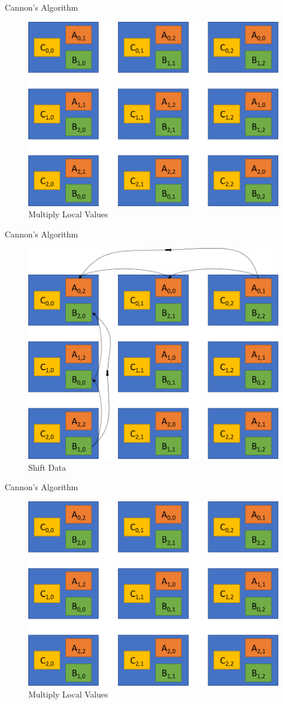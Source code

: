\documentclass[10pt]{beamer}
\begin{document}
\begin{frame}{Cannon's Algorithm}
\begin{figure}	
\centering
\includegraphics[width=0.72\linewidth]{figures/step_2_cannon_2.png}
\caption{Multiply Local Values}
\end{figure}
\end{frame}

\begin{frame}{Cannon's Algorithm}
\begin{figure}	
	\centering
	\includegraphics[width=0.72\linewidth]{figures/step_3_cannon_2.png}
	\caption{Shift Data}
\end{figure}
\end{frame}

\begin{frame}{Cannon's Algorithm}
\begin{figure}	
	\centering
	\includegraphics[width=0.72\linewidth]{figures/step_2_cannon_3.png}
	\caption{Multiply Local Values}
\end{figure}
\end{frame}
\end{document}
